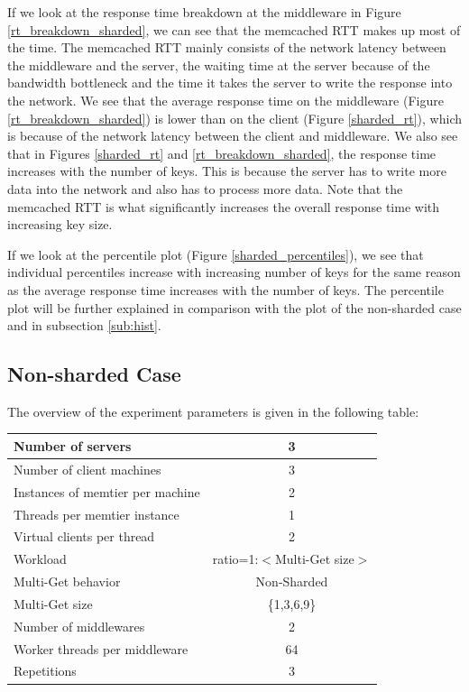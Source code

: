 If we look at the response time breakdown at the middleware in Figure \ref{rt_breakdown_sharded}, we can see that the memcached RTT makes up most of the time. The memcached RTT mainly consists of the network latency between the middleware and the server, the waiting time at the server because of the bandwidth bottleneck and the time it takes the server to write the response into the network. We see that the average response time on the middleware (Figure \ref{rt_breakdown_sharded}) is lower than on the client (Figure \ref{sharded_rt}), which is because of the network latency between the client and middleware. We also see that in Figures \ref{sharded_rt} and \ref{rt_breakdown_sharded}, the response time increases with the number of keys. This is because the server has to write more data into the network and also has to process more data. Note that the memcached RTT is what significantly increases the overall response time with increasing key size. 

If we look at the percentile plot (Figure \ref{sharded_percentiles}), we see that individual percentiles increase with increasing number of keys for the same reason as the average response time increases with the number of keys. 
The percentile plot will be further explained in comparison with the plot of the non-sharded case and in subsection \ref{sub:hist}.

\subsection{Non-sharded Case}
The overview of the experiment parameters is given in the following table:
\begin{center}
	\scriptsize{
		\begin{tabular}{|l|c|}
			\hline Number of servers                & 3                       \\ 
			\hline Number of client machines        & 3                       \\ 
			\hline Instances of memtier per machine & 2                       \\ 
			\hline Threads per memtier instance     & 1                       \\
			\hline Virtual clients per thread       & 2     		            \\ 
			\hline Workload                         & ratio=1:$<$Multi-Get size$>$             \\
			\hline Multi-Get behavior               & Non-Sharded                 \\
			\hline Multi-Get size                   & \{1,3,6,9\}                 \\
			\hline Number of middlewares            & 2                       \\
			\hline Worker threads per middleware    & 64 \\
			\hline Repetitions                      & 3                \\ 
			\hline 
		\end{tabular}
	} 
\end{center}

